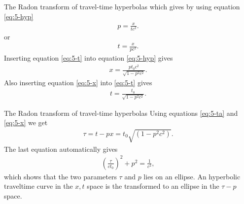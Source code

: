 \documentclass[xcolor=dvipsnames,notes]{beamer}
\begin{document}
\begin{frame}{The Radon transform of travel-time hyperbolas}
which gives by using equation \eqref{eq:5-hyp}
%
\begin{eqnarray}
 p = \frac{x}{tc^2}.
    \label{eq:5-p}
\end{eqnarray}
%
or
%
\begin{eqnarray}
 t = \frac{x}{pc^2}.
    \label{eq:5-t}
\end{eqnarray}
%
Inserting equation \eqref{eq:5-t} into equation 
\eqref{eq:5-hyp} gives
%
\begin{eqnarray}
x=\frac{pt_0 c^2}{\sqrt{1-p^2c^2}}.
    \label{eq:5-x}
\end{eqnarray}
Also inserting equation \eqref{eq:5-x} into \eqref{eq:5-t} gives
\begin{eqnarray}
  t=\frac{t_0}{\sqrt{1-p^2c^2}}.
    \label{eq:5-ta}
\end{eqnarray}
\end{frame}
%
\begin{frame}{The Radon transform of travel-time hyperbolas}
Using equations \eqref{eq:5-ta} and \eqref{eq:5-x} we get
\begin{eqnarray}
 \tau=t-px = t_0\sqrt{(1-p^2c^2)}.
    \label{eq:5-tau}
\end{eqnarray}
The last equation automatically gives
\begin{eqnarray}
 {\left(\frac{\tau}{c t_0}\right)}^2 + p^2 = \frac{1}{c^2},
    \label{eq:5-tau2}
\end{eqnarray}
which shows that the two parameters $\tau$ and $p$ lies on an ellipse.
An hyperbolic traveltime curve in the $x,t$ space is the transformed to an ellipse in
the $\tau-p$ space.
\end{frame}
%
\end{document}
